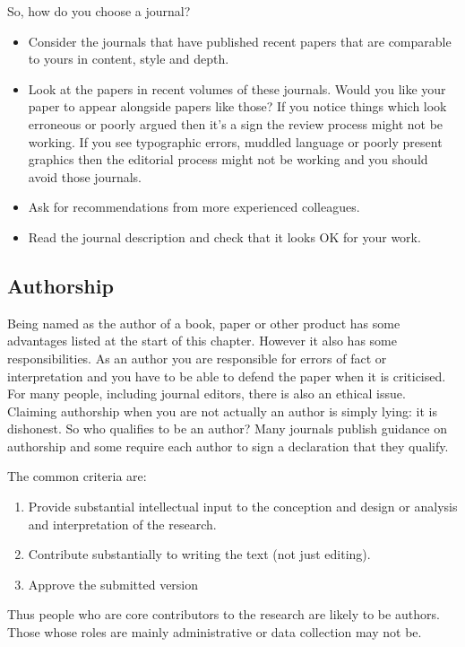 \documentclass[
]{book}
\begin{document}
So, how do you choose a journal?

\begin{itemize}
\item
  Consider the journals that have published recent papers that are comparable to yours in content, style and depth.
\item
  Look at the papers in recent volumes of these journals. Would you like your paper to appear alongside papers like those? If you notice things which look erroneous or poorly argued then it's a sign the review process might not be working. If you see typographic errors, muddled language or poorly present graphics then the editorial process might not be working and you should avoid those journals.
\item
  Ask for recommendations from more experienced colleagues.
\item
  Read the journal description and check that it looks OK for your work.
\end{itemize}

\hypertarget{authorship}{%
\subsection{Authorship}\label{authorship}}

Being named as the author of a book, paper or other product has some advantages listed at the start of this chapter. However it also has some responsibilities. As an author you are responsible for errors of fact or interpretation and you have to be able to defend the paper when it is criticised. For many people, including journal editors, there is also an ethical issue. Claiming authorship when you are not actually an author is simply lying: it is dishonest. So who qualifies to be an author?
Many journals publish guidance on authorship and some require each author to sign a declaration that they qualify.

The common criteria are:

\begin{enumerate}
\def\labelenumi{\arabic{enumi}.}
\item
  Provide substantial intellectual input to the conception and design or analysis and interpretation of the research.
\item
  Contribute substantially to writing the text (not just editing).
\item
  Approve the submitted version
\end{enumerate}

Thus people who are core contributors to the research are likely to be authors. Those whose roles are mainly administrative or data collection may not be.
\end{document}
